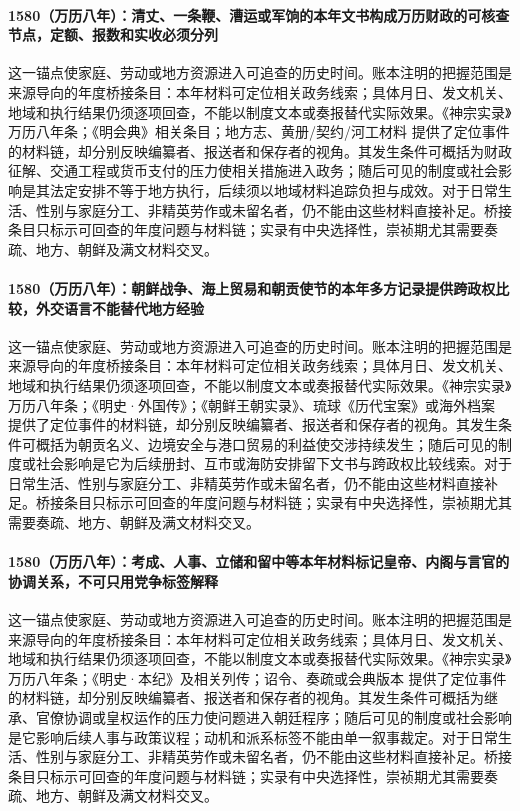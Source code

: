 \paragraph{1580（万历八年）：清丈、一条鞭、漕运或军饷的本年文书构成万历财政的可核查节点，定额、报数和实收必须分列} 这一锚点使家庭、劳动或地方资源进入可追查的历史时间。账本注明的把握范围是来源导向的年度桥接条目：本年材料可定位相关政务线索；具体月日、发文机关、地域和执行结果仍须逐项回查，不能以制度文本或奏报替代实际效果。《神宗实录》万历八年条；《明会典》相关条目；地方志、黄册/契约/河工材料 提供了定位事件的材料链，却分别反映编纂者、报送者和保存者的视角。其发生条件可概括为财政征解、交通工程或货币支付的压力使相关措施进入政务；随后可见的制度或社会影响是其法定安排不等于地方执行，后续须以地域材料追踪负担与成效。对于日常生活、性别与家庭分工、非精英劳作或未留名者，仍不能由这些材料直接补足。桥接条目只标示可回查的年度问题与材料链；实录有中央选择性，崇祯期尤其需要奏疏、地方、朝鲜及满文材料交叉。

\paragraph{1580（万历八年）：朝鲜战争、海上贸易和朝贡使节的本年多方记录提供跨政权比较，外交语言不能替代地方经验} 这一锚点使家庭、劳动或地方资源进入可追查的历史时间。账本注明的把握范围是来源导向的年度桥接条目：本年材料可定位相关政务线索；具体月日、发文机关、地域和执行结果仍须逐项回查，不能以制度文本或奏报替代实际效果。《神宗实录》万历八年条；《明史·外国传》；《朝鲜王朝实录》、琉球《历代宝案》或海外档案 提供了定位事件的材料链，却分别反映编纂者、报送者和保存者的视角。其发生条件可概括为朝贡名义、边境安全与港口贸易的利益使交涉持续发生；随后可见的制度或社会影响是它为后续册封、互市或海防安排留下文书与跨政权比较线索。对于日常生活、性别与家庭分工、非精英劳作或未留名者，仍不能由这些材料直接补足。桥接条目只标示可回查的年度问题与材料链；实录有中央选择性，崇祯期尤其需要奏疏、地方、朝鲜及满文材料交叉。

\paragraph{1580（万历八年）：考成、人事、立储和留中等本年材料标记皇帝、内阁与言官的协调关系，不可只用党争标签解释} 这一锚点使家庭、劳动或地方资源进入可追查的历史时间。账本注明的把握范围是来源导向的年度桥接条目：本年材料可定位相关政务线索；具体月日、发文机关、地域和执行结果仍须逐项回查，不能以制度文本或奏报替代实际效果。《神宗实录》万历八年条；《明史·本纪》及相关列传；诏令、奏疏或会典版本 提供了定位事件的材料链，却分别反映编纂者、报送者和保存者的视角。其发生条件可概括为继承、官僚协调或皇权运作的压力使问题进入朝廷程序；随后可见的制度或社会影响是它影响后续人事与政策议程；动机和派系标签不能由单一叙事裁定。对于日常生活、性别与家庭分工、非精英劳作或未留名者，仍不能由这些材料直接补足。桥接条目只标示可回查的年度问题与材料链；实录有中央选择性，崇祯期尤其需要奏疏、地方、朝鲜及满文材料交叉。

